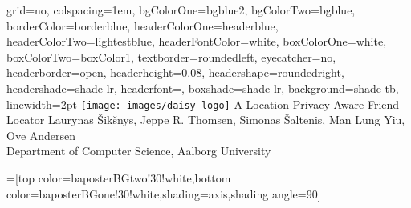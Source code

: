 \documentclass[a3shrink,landscape,final]{baposter}
\begin{document}
\newlength{\leftimgwidth}
\begin{poster}%
  {
  grid=no,
  colspacing=1em,
  bgColorOne=bgblue2,
  bgColorTwo=bgblue,
  borderColor=borderblue,
  headerColorOne=headerblue,
  headerColorTwo=lightestblue,
  headerFontColor=white,
  boxColorOne=white,
  boxColorTwo=boxColor1,
  textborder=roundedleft,
  eyecatcher=no,
  headerborder=open,
  headerheight=0.08\textheight,
  headershape=roundedright,
  headershade=shade-lr,
  headerfont=\Large\textsf, %
  boxshade=shade-lr,
  background=shade-tb,
  linewidth=2pt
  }
  {\texttt{[image: images/daisy-logo]}} %
  {\sf %
  A Location Privacy Aware Friend Locator}
  {\sf %
  \vspace{0.1em} Laurynas \v{S}ik\v{s}nys, Jeppe R. Thomsen, Simonas \v{S}altenis, Man Lung Yiu, Ove Andersen\\
  {\vspace{0.2em}\large Department of Computer Science, Aalborg University}
  }
  {%
  }

  =[top color=baposterBGtwo!30!white,bottom color=baposterBGone!30!white,shading=axis,shading angle=90]

     \setlength{\leftimgwidth}{0.78em+8.0em}

    \newcommand{\colouredcircle}[1]{%
      \tikz{\useasboundingbox (-0.2em,-0.32em) rectangle(0.2em,0.32em);
\draw[draw=black,fill=borderblue!80!black!#1!white,line width=0.03em] (0,0)
circle(0.18em);}}


\end{poster}
\end{document}
